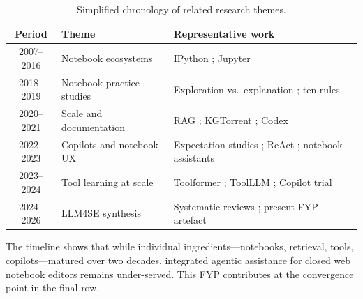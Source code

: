 \begin{table}[!ht]
\centering
\caption{Simplified chronology of related research themes.}
\label{tab:timeline}
\small
\begin{tabular}{|c|p{4.2cm}|p{6.8cm}|}
\hline
\textbf{Period} & \textbf{Theme} & \textbf{Representative work} \\ \hline
2007--2016 & Notebook ecosystems & IPython \parencite{perez2007ipython}; Jupyter \parencite{kluyver2016jupyter} \\ \hline
2018--2019 & Notebook practice studies & Exploration vs.\ explanation \parencite{rule2018exploration}; ten rules \parencite{rule2019tenrules} \\ \hline
2020--2021 & Scale and documentation & \ac{RAG} \parencite{lewis2020rag}; KGTorrent \parencite{quaranta2021kgtorrent}; Codex \parencite{chen2021codex} \\ \hline
2022--2023 & Copilots and notebook UX & Expectation studies \parencite{vaithilingam2022expectation}; ReAct \parencite{yao2023react}; notebook assistants \parencite{mcnutt2023notebookassistants} \\ \hline
2023--2024 & Tool learning at scale & Toolformer \parencite{schick2023toolformer}; ToolLLM \parencite{qin2024toolllm}; Copilot trial \parencite{ziegler2024copilot} \\ \hline
2024--2026 & LLM4SE synthesis & Systematic reviews \parencite{hou2024llm4se}; present FYP artefact \\ \hline
\end{tabular}
\end{table}

The timeline shows that while individual ingredients---notebooks, retrieval, tools, copilots---matured over two decades, integrated agentic assistance for closed web notebook editors remains under-served. This FYP contributes at the convergence point in the final row.
